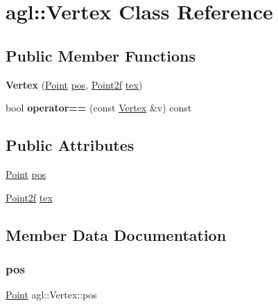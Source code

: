 \hypertarget{classagl_1_1Vertex}{}\section{agl\+::Vertex Class Reference}
\label{classagl_1_1Vertex}
\subsection*{Public Member Functions}
\begin{DoxyCompactItemize}
\item 
\mbox{\label{classagl_1_1Vertex_a31deb05b323aafd6968956295adf634f}} 
{\bfseries Vertex} (\mbox{\hyperlink{classagl_1_1Point}{Point}} \mbox{\hyperlink{classagl_1_1Vertex_a2d583fe39d5de75a2b588fe09ed6266c}{pos}}, \mbox{\hyperlink{classagl_1_1Point2f}{Point2f}} \mbox{\hyperlink{classagl_1_1Vertex_a1fbcafc91c5862241918f6ab6458148b}{tex}})
\item 
\mbox{\label{classagl_1_1Vertex_a31371885b77831afc7a90933566ca39c}} 
bool {\bfseries operator==} (const \mbox{\hyperlink{classagl_1_1Vertex}{Vertex}} \&v) const
\end{DoxyCompactItemize}
\subsection*{Public Attributes}
\begin{DoxyCompactItemize}
\item 
\mbox{\hyperlink{classagl_1_1Point}{Point}} \mbox{\hyperlink{classagl_1_1Vertex_a2d583fe39d5de75a2b588fe09ed6266c}{pos}}
\item 
\mbox{\hyperlink{classagl_1_1Point2f}{Point2f}} \mbox{\hyperlink{classagl_1_1Vertex_a1fbcafc91c5862241918f6ab6458148b}{tex}}
\end{DoxyCompactItemize}


\subsection{Member Data Documentation}
\mbox{\label{classagl_1_1Vertex_a2d583fe39d5de75a2b588fe09ed6266c}} 
\subsubsection{\texorpdfstring{pos}{pos}}
{\footnotesize\ttfamily \mbox{\hyperlink{classagl_1_1Point}{Point}} agl\+::\+Vertex\+::pos}

